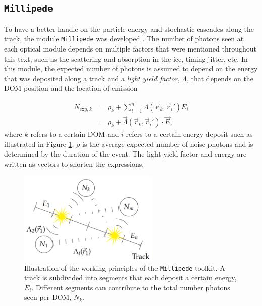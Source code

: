 \subsection{\texttt{Millipede}}
\label{subsec:millipede}
To have a better handle on the particle energy and stochastic cascades along the track, the module \texttt{Millipede} was developed \cite{millipedeinternal, Aartsen:2013vja}. The number of photons seen at each optical module depends on multiple factors that were mentioned throughout this text, such as the scattering and absorption in the ice, timing jitter, etc. In this module, the expected number of photons is assumed to depend on the energy that was deposited along a track and a \textit{light yield factor}, $\Lambda$, that depends on the DOM position and the location of emission

\begin{equation}
\label{eq:n_exp}
\begin{split}
N_{\textrm{exp},k} &= \rho_k + \sum^n_{i=1} \Lambda(\vec{r}_k,\vec{r}_i') E_i\\
&= \rho_k + \vec{\Lambda}(\vec{r}_k,\vec{r}_i') \cdot \vec{E},
\end{split}
\end{equation}
where $k$ refers to a certain DOM and $i$ refers to a certain energy deposit such as illustrated in Figure \ref{fig:millipede}. $\rho$ is the average expected number of noise photons and is determined by the duration of the event. The light yield factor and energy are written as vectors to shorten the expressions. 

\begin{figure}
\centering
\includegraphics[width=0.6\textwidth]{chapter7/img/millipede.png}
\caption{Illustration of the working principles of the \texttt{Millipede} toolkit. A track is subdivided into segments that each deposit a certain energy, $E_i$. Different segments can contribute to the total number photons seen per DOM, $N_k$.}
\label{fig:millipede}
\end{figure}

